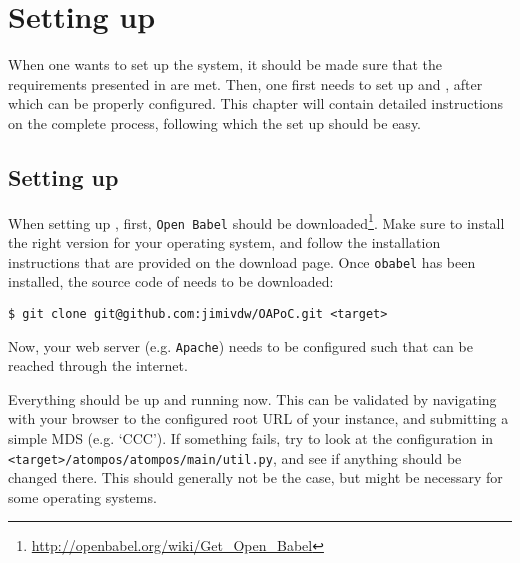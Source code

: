 \chapter{Setting up \oframp}

\lstset{language=sh, frame=single, basicstyle=\ttfamily\small, breaklines=true}

When one wants to set up the \oframp{} system, it should be made sure that the requirements presented in  are met. Then, one first needs to set up \oapoc{} and \omfraf{}, after which \oframp{} can be properly configured. This chapter will contain detailed instructions on the complete process, following which the set up should be easy.



\section[\oapoc]{Setting up \oapoc}
When setting up \oapoc, first, \verb|Open Babel| should be downloaded\footnote{\url{http://openbabel.org/wiki/Get_Open_Babel}}. Make sure to install the right version for your operating system, and follow the installation instructions that are provided on the download page. Once \verb|obabel| has been installed, the source code of \oapoc{} needs to be downloaded:
\begin{lstlisting}
$ git clone git@github.com:jimivdw/OAPoC.git <target>
\end{lstlisting}
Now, your web server (e.g. \verb|Apache|) needs to be configured such that \oapoc{} can be reached through the internet.

Everything should be up and running now. This can be validated by navigating with your browser to the configured root URL of your \oapoc{} instance, and submitting a simple MDS (e.g. `CCC'). If something fails, try to look at the configuration in \verb|<target>/atompos/atompos/main/util.py|, and see if anything should be changed there. This should generally not be the case, but might be necessary for some operating systems.



